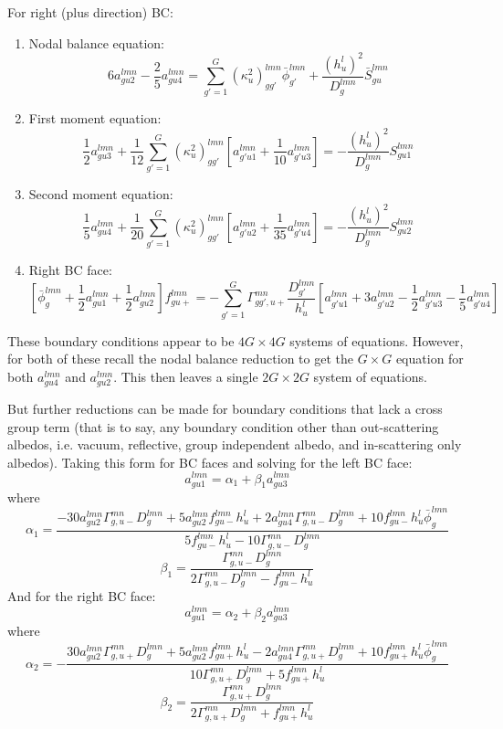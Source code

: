 For right (plus direction) BC:
\begin{enumerate}
    \item Nodal balance equation:
        \[
        6a_{gu2}^{lmn}-\frac{2}{5}a_{gu4}^{lmn}=\sum_{g'=1}^G(\kappa_u^2)_{gg'}^{lmn}\bar{\phi}_{g'}^{lmn}+\frac{(h_u^{l})^2}{D_g^{lmn}}\bar{S}_{gu}^{lmn}
        \]
    \item First moment equation:
        \[
        \frac{1}{2}a_{gu3}^{lmn}+\frac{1}{12}\sum_{g'=1}^G(\kappa_u^2)_{gg'}^{lmn}\left[a_{g'u1}^{lmn}+\frac{1}{10}a_{g'u3}^{lmn}\right]=-\frac{(h_u^{l})^2}{D_g^{lmn}}S_{gu1}^{lmn}
        \]
    \item Second moment equation:
        \[
        \frac{1}{5}a_{gu4}^{lmn}+\frac{1}{20}\sum_{g'=1}^G(\kappa_u^2)_{gg'}^{lmn}\left[a_{g'u2}^{lmn}+\frac{1}{35}a_{g'u4}^{lmn}\right]=-\frac{(h_u^{l})^2}{D_g^{lmn}}S_{gu2}^{lmn}
        \]
    \item Right BC face:
        \[
        \left[\bar{\phi}_{g}^{lmn}+\frac{1}{2}a_{gu1}^{lmn}+\frac{1}{2}a_{gu2}^{lmn}\right]f_{gu+}^{lmn}=-\sum_{g'=1}^G\Gamma_{gg',u+}^{mn}\frac{D_{g'}^{lmn}}{h_u^{l}}\left[a_{g'u1}^{lmn}+3a_{g'u2}^{lmn}-\frac{1}{2}a_{g'u3}^{lmn}-\frac{1}{5}a_{g'u4}^{lmn}\right]
        \]
\end{enumerate}

These boundary conditions appear to be $4G\times 4G$ systems of equations.
However, for both of these recall the nodal balance reduction to get the $G\times G$ equation for both $a_{gu4}^{lmn}$ and $a_{gu2}^{lmn}$.
This then leaves a single $2G\times 2G$ system of equations.

But further reductions can be made for boundary conditions that lack a cross group term (that is to say, any boundary condition other than out-scattering albedos, i.e. vacuum, reflective, group independent albedo, and in-scattering only albedos).
Taking this form for BC faces and solving for the left BC face:
\[
a_{gu1}^{lmn}=\alpha_1+\beta_1a_{gu3}^{lmn}
\]
where
\[
\alpha_1=\frac{-30 a_{gu2}^{lmn}\Gamma_{g,u-}^{mn} D_g^{lmn}+5 a_{gu2}^{lmn}f_{gu-}^{lmn} h_u^{l}+2 a_{gu4}^{lmn} \Gamma_{g,u-}^{mn} D_g^{lmn}+10 f_{gu-}^{lmn} h_u^{l} \bar{\phi}_{g}^{lmn}}{5 f_{gu-}^{lmn} h_u^{l}-10 \Gamma_{g,u-}^{mn} D_g^{lmn}}
\]
\[
\beta_1=\frac{\Gamma_{g,u-}^{mn} D_g^{lmn}}{2 \Gamma_{g,u-}^{mn} D_g^{lmn}-f_{gu-}^{lmn} h_u^{l}}
\]
And for the right BC face:
\[
a_{gu1}^{lmn}=\alpha_2+\beta_2a_{gu3}^{lmn}
\]
where
\[
\alpha_2=-\frac{30 a_{gu2}^{lmn}\Gamma_{g,u+}^{mn} D_g^{lmn}+5 a_{gu2}^{lmn}f_{gu+}^{lmn} h_u^{l}-2 a_{gu4}^{lmn} \Gamma_{g,u+}^{mn} D_g^{lmn}+10 f_{gu+}^{lmn} h_u^{l} \bar{\phi}_{g}^{lmn}}{10 \Gamma_{g,u+}^{mn} D_g^{lmn}+5 f_{gu+}^{lmn} h_u^{l}}
\]
\[
\beta_2=\frac{\Gamma_{g,u+}^{mn} D_g^{lmn}}{2 \Gamma_{g,u+}^{mn} D_g^{lmn}+f_{gu+}^{lmn} h_u^{l}}
\]

